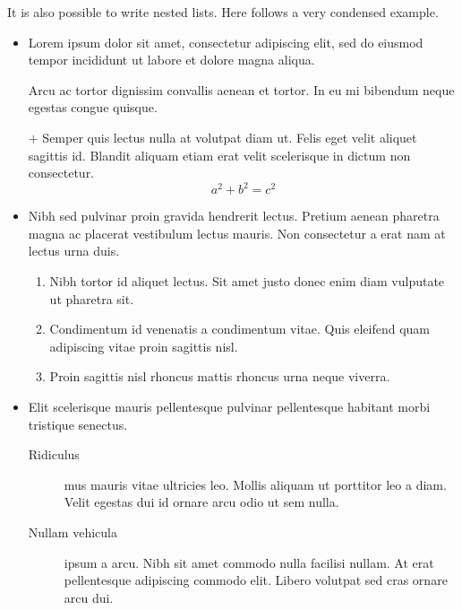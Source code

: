 \documentclass[a4paper, 12pt]{report}
\begin{document}
    It is also possible to write nested lists. Here follows a very condensed example.

    \begin{itemize}
        \item Lorem ipsum dolor sit amet, consectetur adipiscing elit, sed do eiusmod tempor incididunt ut labore et dolore magna aliqua.

        Arcu ac tortor dignissim convallis aenean et tortor. In eu mi bibendum neque egestas congue quisque.

        \item[$+$] Semper quis lectus nulla at volutpat diam ut. Felis eget velit aliquet sagittis id. Blandit aliquam etiam erat velit scelerisque in dictum non consectetur.
        \begin{equation}\label{equation:exemple}
            a^2 + b^2 = c^2
        \end{equation}

        \item Nibh sed pulvinar proin gravida hendrerit lectus. Pretium aenean pharetra magna ac placerat vestibulum lectus mauris. Non consectetur a erat nam at lectus urna duis.
        \begin{enumerate}[noitemsep, label=\roman*.]
            \item Nibh tortor id aliquet lectus. Sit amet justo donec enim diam vulputate ut pharetra sit.
            \setcounter{enumi}{3}
            \item Condimentum id venenatis a condimentum vitae. Quis eleifend quam adipiscing vitae proin sagittis nisl.
            \addtocounter{enumi}{15}
            \item Proin sagittis nisl rhoncus mattis rhoncus urna neque viverra.
        \end{enumerate}

        \item Elit scelerisque mauris pellentesque pulvinar pellentesque habitant morbi tristique senectus.
            \begin{description}
                \item[Ridiculus] mus mauris vitae ultricies leo. Mollis aliquam ut porttitor leo a diam. Velit egestas dui id ornare arcu odio ut sem nulla.
                \item[Nullam vehicula] ipsum a arcu. Nibh sit amet commodo nulla facilisi nullam. At erat pellentesque adipiscing commodo elit. Libero volutpat sed cras ornare arcu dui.
            \end{description}
    \end{itemize}
\end{document}
